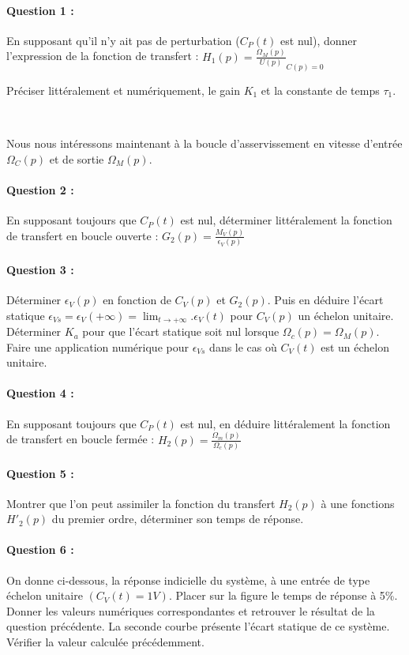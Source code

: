 \paragraph{Question 1 :} En supposant qu'il n'y ait pas de perturbation ($C_P(t)$ est nul), donner l'expression de la fonction de transfert : $H_1(p)=\frac{\Omega_M(p)}{U(p)}_{C(p)=0}$

Préciser littéralement et numériquement, le gain $K_1$ et la constante de temps $\tau_1$.

~\

Nous nous intéressons maintenant à la boucle d'asservissement en vitesse d'entrée $\Omega_C(p)$ et de sortie $\Omega_M(p)$.

\paragraph{Question 2 :} En supposant toujours que $C_P(t)$ est nul, déterminer littéralement la fonction de transfert en boucle ouverte : $G_2(p)=\frac{M_V(p)}{\epsilon_V(p)}$	

\paragraph{Question 3 :} Déterminer $\epsilon_V(p)$ en fonction de $C_V(p)$ et $G_2(p)$. Puis en déduire l'écart statique
$ \displaystyle \epsilon_{Vs}=\epsilon_V(+\infty)=\lim_{t\rightarrow + \infty}.\epsilon_V(t)$ pour $C_V(p)$ un échelon unitaire. Déterminer $K_a$ pour que l'écart statique soit nul lorsque $\Omega_c(p)=\Omega_M(p)$. Faire une application numérique pour $\epsilon_{Vs}$ dans le cas où $C_V(t)$ est un échelon unitaire.

\paragraph{Question 4 :} En supposant toujours que $C_P(t)$ est nul, en déduire littéralement la fonction de transfert en boucle fermée : $H_2(p)=\frac{\Omega_m(p)}{\Omega_c(p)}$	

\paragraph{Question 5 :} Montrer que l'on peut assimiler la fonction du transfert $H_2(p)$ à une fonctions $H'_2(p)$ du premier ordre, déterminer son temps de réponse.

\paragraph{Question 6 :} On donne ci-dessous, la réponse indicielle du système, à une entrée de type échelon unitaire $(C_V(t)=1V)$. Placer sur la figure le temps de réponse à 5\%. Donner les valeurs numériques correspondantes et retrouver le résultat de la question précédente. La seconde courbe présente l'écart statique de ce système. Vérifier la valeur calculée précédemment.

